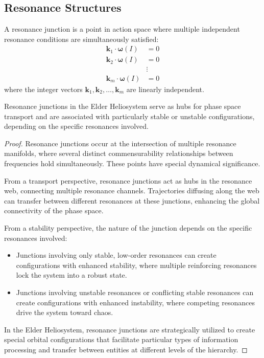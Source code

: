\subsection{Resonance Structures}

\begin{definition}
A resonance junction is a point in action space where multiple independent resonance conditions are simultaneously satisfied:
\begin{align}
\mathbf{k}_1 \cdot \boldsymbol{\omega}(I) &= 0 \\
\mathbf{k}_2 \cdot \boldsymbol{\omega}(I) &= 0 \\
&\vdots \\
\mathbf{k}_m \cdot \boldsymbol{\omega}(I) &= 0
\end{align}
where the integer vectors $\mathbf{k}_1, \mathbf{k}_2, \ldots, \mathbf{k}_m$ are linearly independent.
\end{definition}

\begin{theorem}
Resonance junctions in the Elder Heliosystem serve as hubs for phase space transport and are associated with particularly stable or unstable configurations, depending on the specific resonances involved.
\end{theorem}

\begin{proof}
Resonance junctions occur at the intersection of multiple resonance manifolds, where several distinct commensurability relationships between frequencies hold simultaneously. These points have special dynamical significance.

From a transport perspective, resonance junctions act as hubs in the resonance web, connecting multiple resonance channels. Trajectories diffusing along the web can transfer between different resonances at these junctions, enhancing the global connectivity of the phase space.

From a stability perspective, the nature of the junction depends on the specific resonances involved:
\begin{itemize}
    \item Junctions involving only stable, low-order resonances can create configurations with enhanced stability, where multiple reinforcing resonances lock the system into a robust state.
    \item Junctions involving unstable resonances or conflicting stable resonances can create configurations with enhanced instability, where competing resonances drive the system toward chaos.
\end{itemize}

In the Elder Heliosystem, resonance junctions are strategically utilized to create special orbital configurations that facilitate particular types of information processing and transfer between entities at different levels of the hierarchy.
\end{proof}

